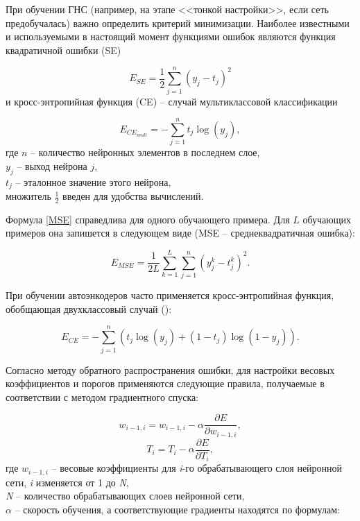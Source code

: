При обучении ГНС (например, на этапе <<тонкой настройки>>, если сеть предобучалась) важно определить критерий минимизации. Наиболее известными и используемыми в настоящий момент функциями ошибок являются функция квадратичной ошибки (SE)

\begin{equation}
	\label{MSE}
	E_{SE} = \frac{1}{2}\sum_{j=1}^{n}(y_j - t_j)^2
\end{equation}
и кросс-энтропийная функция (CE) -- случай мультиклассовой классификации

\begin{equation}
	\label{CE_multiclass}
	E_{CE_{mult}} = -\sum_{j=1}^{n}t_j\log(y_j),
\end{equation}
где $n$ -- количество нейронных элементов в последнем слое,\\
$y_j$ -- выход нейрона $j$,\\
$t_j$ -- эталонное значение этого нейрона,\\
множитель $\frac{1}{2}$ введен для удобства вычислений.

Формула \ref{MSE} справедлива для одного обучающего примера. Для $L$ обучающих примеров она запишется в следующем виде (MSE -- среднеквадратичная ошибка):

\begin{equation}
	\label{MSE_L}
	E_{MSE} = \frac{1}{2L}\sum_{k=1}^{L}\sum_{j=1}^{n}(y_j^k - t_j^k)^2.
\end{equation}

При обучении автоэнкодеров часто применяется кросс-энтропийная функция, обобщающая двухклассовый случай (\cite{Amaral2013}):

\begin{equation}
	\label{CE}
	E_{CE} = -\sum_{j=1}^n(t_j\log(y_j) + (1-t_j)\log(1-y_j)).
\end{equation}

Согласно методу обратного распространения ошибки, для настройки весовых коэффициентов и порогов применяются следующие правила, получаемые в соответствии с методом градиентного спуска:

\begin{equation}
	w_{i-1,i} = w_{i-1, i} - \alpha \frac{\partial E}{\partial w_{i-1, i}},
\end{equation}
\begin{equation}
	T_i = T_i - \alpha \frac{\partial E}{\partial T_i},
\end{equation}
где $w_{i-1,i}$ -- весовые коэффициенты для \textit{i}-го обрабатывающего слоя нейронной сети, \textit{i} изменяется от 1 до \textit{N},\\
\textit{N} -- количество обрабатывающих слоев нейронной сети,\\
$\alpha$ -- скорость обучения, а соответствующие градиенты находятся по формулам:

